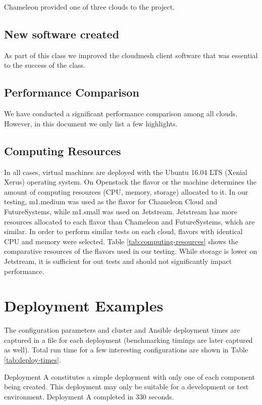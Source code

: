 \documentclass[sigconf]{acmart}
\begin{document}
Chameleon provided one of three clouds to the project.


\subsection{New software created}

As part of this class we improved the cloudmesh client software
\cite{www-cloudmesh-client}\cite{www-cloudmesh-cmd5}
\cite{www-cloudmesh-rest} that was essential to the success of the
class.

\subsection{Performance Comparison}

We have conducted a significant performance comparison among all
clouds. However, in this document we only list a few highlights.

\subsection{Computing Resources}

In all cases, virtual machines are deployed with the Ubuntu 16.04 LTS
(Xenial Xerus) operating system.  On Openstack the flavor or the
machine determines the amount of computing resources (CPU, memory,
storage) allocated to it.  In our testing, m1.medium was used as the
flavor for Chameleon Cloud and FutureSystems, while  m1.small was used
on Jetstream.  Jetstream has more resources allocated to each flavor
than Chameleon and FutureSystems, which are similar.  In order to
perform similar tests on each cloud, flavors with identical CPU and
memory were selected. Table \ref{tab:computing-resources} shows the
comparative resources of the flavors used in our testing.  While
storage is lower on Jetstream, it is sufficient for out tests and
should not significantly impact performance. 

\section{Deployment Examples}

The configuration parameters and cluster and Ansible deployment times
are captured in a file for each deployment (benchmarking timings are
later captured as well).  Total run time for a few interesting
configurations are shown in Table \ref{tab:deploy-times}.

Deployment A constitutes a simple deployment with only one of each component
being created.  This deployment may only be suitable for a development
or test environment.  Deployment A completed in 330 seconds.
\end{document}

